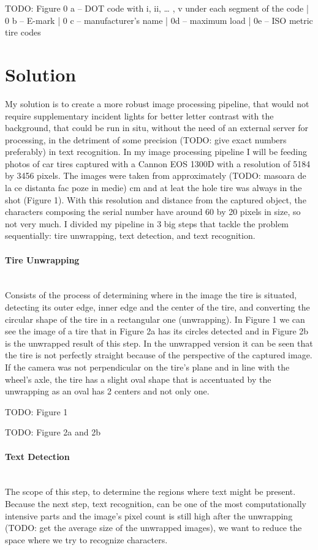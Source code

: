 TODO: Figure 0 a -- DOT code with i, ii, … , v under each segment of the code | 0 b -- E-mark | 0 c -- manufacturer's name | 0d -- maximum load | 0e -- ISO metric tire codes

\section{Solution}

My solution is to create a more robust image processing pipeline, that would not require supplementary incident lights for better letter contrast with the background, that could be run in situ, without the need of an external server for processing, in the detriment of some precision (TODO: give exact numbers preferably) in text recognition. In my image processing pipeline I will be feeding photos of car tires captured with a Cannon EOS 1300D with a resolution of 5184 by 3456 pixels. The images were taken from approximately (TODO: masoara de la ce distanta fac poze in medie) cm and at leat the hole tire was always in the shot (Figure 1). With this resolution and distance from the captured object, the characters composing the serial number have around 60 by 20 pixels in size, so not very much. I divided my pipeline in 3 big steps that tackle the problem sequentially: tire unwrapping, text detection, and text recognition.

\paragraph*{Tire Unwrapping}\mbox{}\\
Consists of the process of determining where in the image the tire is situated, detecting its outer edge, inner edge and the center of the tire, and converting the circular shape of the tire in a rectangular one (unwrapping). In Figure 1 we can see the image of a tire that in Figure 2a has its circles detected and in Figure 2b is the unwrapped result of this step. In the unwrapped version it can be seen that the tire is not perfectly straight because of the perspective of the captured image. If the camera was not perpendicular on the tire's plane and in line with the wheel's axle, the tire has a slight oval shape that is accentuated by the unwrapping as an oval has 2 centers and not only one.

	TODO: Figure 1

	TODO: Figure 2a and 2b

\paragraph*{Text Detection}\mbox{}\\
The scope of this step, to determine the regions where text might be present. Because the next step, text recognition, can be one of the most computationally intensive parts and the image's pixel count is still high after the unwrapping (TODO: get the average size of the unwrapped images), we want to reduce the space where we try to recognize characters.

